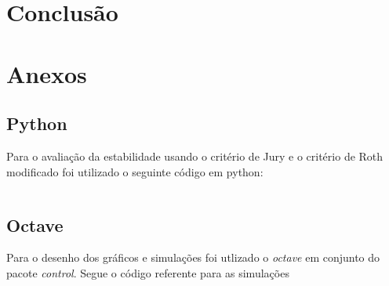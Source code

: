 \documentclass[a4paper,11pt]{article}
\begin{document}
\section{Conclusão}




\nocite{sympy}



\section{Anexos}
\subsection{Python}

Para o avaliação da estabilidade usando o critério de Jury e o critério de Roth modificado foi utilizado o seguinte código em python:

\inputminted[xleftmargin=15pt,linenos,frame=single,framesep=5pt]{python}{../python/exsim1.py}

\subsection{Octave}

Para o desenho dos gráficos e simulações foi utlizado o \textit{octave} em conjunto do pacote \textit{control}. Segue o código referente para as simulações

\inputminted[xleftmargin=15pt,linenos,frame=single,framesep=5pt]{matlab}{../matlab/exsim1.m}


\end{document}
